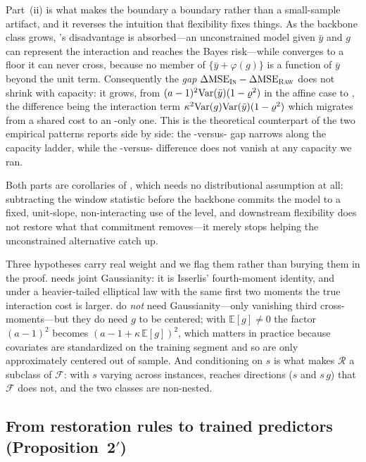 Part~(ii) is what makes the boundary a boundary rather than a small-sample artifact, and it reverses the intuition that flexibility fixes things. As the backbone class grows, \rawm's disadvantage is absorbed---an unconstrained model given $\bar y$ and $g$ can represent the interaction and reaches the Bayes risk---while \inm{} converges to a floor it can never cross, because no member of $\{\bar y + \varphi(g)\}$ is a function of $\bar y$ beyond the unit term. Consequently the \emph{gap} $\Delta\mathrm{MSE}_{\textsc{In}} - \Delta\mathrm{MSE}_{\textsc{Raw}}$ does not shrink with capacity: it grows, from $(a-1)^2\mathrm{Var}(\bar y)(1-\varrho^2)$ in the affine case to , the difference being the interaction term $\kappa^2\mathrm{Var}(g)\mathrm{Var}(\bar y)(1-\varrho^2)$ which migrates from a shared cost to an \inm-only one. This is the theoretical counterpart of the two empirical patterns  reports side by side: the \rawm-versus-\cnm{} gap narrows along the capacity ladder, while the \inm-versus-\rawm{} difference does not vanish at any capacity we ran.

Both parts are corollaries of , which needs no distributional assumption at all: subtracting the window statistic before the backbone commits the model to a fixed, unit-slope, non-interacting use of the level, and downstream flexibility does not restore what that commitment removes---it merely stops helping the unconstrained alternative catch up.

Three hypotheses carry real weight and we flag them rather than burying them in the proof.  needs joint Gaussianity: it is Isserlis' fourth-moment identity, and under a heavier-tailed elliptical law with the same first two moments the true interaction cost is larger.  do \emph{not} need Gaussianity---only vanishing third cross-moments---but they do need $g$ to be centered; with $\mathbb{E}[g] \neq 0$ the factor $(a-1)^2$ becomes $(a-1+\kappa\,\mathbb{E}[g])^2$, which matters in practice because covariates are standardized on the training segment and so are only approximately centered out of sample. And conditioning on $s$ is what makes $\mathcal{R}$ a subclass of $\mathcal{F}$: with $s$ varying across instances,  reaches directions ($s$ and $s\,g$) that $\mathcal{F}$ does not, and the two classes are non-nested.

\subsection{From restoration rules to trained predictors (Proposition~2$'$)}

